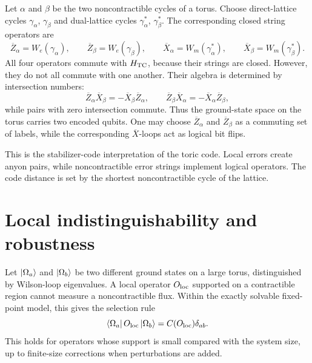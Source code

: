 Let \(\alpha\) and \(\beta\) be the two noncontractible cycles of a torus.  Choose
direct-lattice cycles \(\gamma_{\alpha}\), \(\gamma_{\beta}\) and dual-lattice
cycles \(\gamma^\ast_{\alpha}\), \(\gamma^\ast_{\beta}\).  The corresponding
closed string operators are
\begin{equation}
\label{eq:toric-code-logical-loops}
    \overline{Z}_{\alpha}=W_e(\gamma_{\alpha}),
    \qquad
    \overline{Z}_{\beta}=W_e(\gamma_{\beta}),
    \qquad
    \overline{X}_{\alpha}=W_m(\gamma^\ast_{\alpha}),
    \qquad
    \overline{X}_{\beta}=W_m(\gamma^\ast_{\beta}) .
\end{equation}
All four operators commute with \(H_{\rm TC}\), because their strings are closed.
However, they do not all commute with one another.  Their algebra is determined
by intersection numbers:
\begin{equation}
\label{eq:toric-code-logical-loop-algebra}
    \overline{Z}_{\alpha}\overline{X}_{\beta}
    =
    -\overline{X}_{\beta}\overline{Z}_{\alpha},
    \qquad
    \overline{Z}_{\beta}\overline{X}_{\alpha}
    =
    -\overline{X}_{\alpha}\overline{Z}_{\beta},
\end{equation}
while pairs with zero intersection commute.  Thus the ground-state space on the
torus carries two encoded qubits.  One may choose \(\overline{Z}_{\alpha}\) and
\(\overline{Z}_{\beta}\) as a commuting set of labels, while the corresponding
\(\overline{X}\)-loops act as logical bit flips.

This is the stabilizer-code interpretation of the toric code.  Local errors
create anyon pairs, while noncontractible error strings implement logical
operators.  The code distance is set by the shortest noncontractible cycle of
the lattice.

\section{Local indistinguishability and robustness}
\label{sec:toric-code-local-indistinguishability}

Let \(\left|\Omega_a\right\rangle\) and \(\left|\Omega_b\right\rangle\) be two different ground states on a
large torus, distinguished by Wilson-loop eigenvalues.  A local operator
\(O_{\rm loc}\) supported on a contractible region cannot measure a
noncontractible flux.  Within the exactly solvable fixed-point model, this gives
the selection rule
\begin{equation}
\label{eq:toric-code-local-indistinguishability}
    \left\langle \Omega_a\right|O_{\rm loc}\left|\Omega_b\right\rangle
    =
    C(O_{\rm loc})\delta_{ab} .
\end{equation}
This holds for operators whose support is small compared with the system size, up to
finite-size corrections when perturbations are added.


